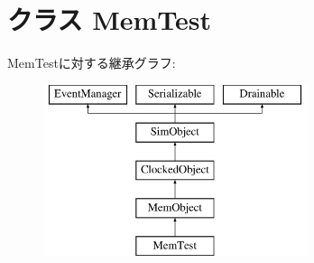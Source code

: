 \hypertarget{classMemTest_1_1MemTest}{
\section{クラス MemTest}
\label{classMemTest_1_1MemTest}
}
MemTestに対する継承グラフ:\begin{figure}[H]
\begin{center}
\leavevmode
\includegraphics[height=5cm]{classMemTest_1_1MemTest}
\end{center}
\end{figure}
